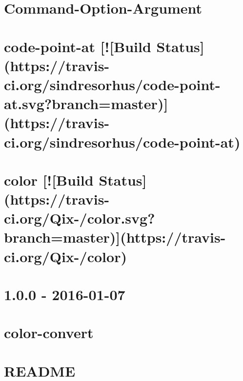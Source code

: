 \documentclass[twoside]{book}
\newcommand{\+}{\discretionary{\mbox{\scriptsize$\hookleftarrow$}}{}{}}
\begin{document}
\chapter{Command-\/\+Option-\/\+Argument}
\label{md__c_1_workspace_demo_src_main_script_node_modules_coa__r_e_a_d_m_e_8ru}

\chapter{code-\/point-\/at \mbox{[}!\mbox{[}Build Status\mbox{]}(https\+://travis-\/ci.org/sindresorhus/code-\/point-\/at.svg?branch=master)\mbox{]}(https\+://travis-\/ci.org/sindresorhus/code-\/point-\/at)}
\label{md__c_1_workspace_demo_src_main_script_node_modules_code-point-at_readme}

\chapter{color \mbox{[}!\mbox{[}Build Status\mbox{]}(https\+://travis-\/ci.org/\+Qix-\//color.svg?branch=master)\mbox{]}(https\+://travis-\/ci.org/\+Qix-\//color)}
\label{md__c_1_workspace_demo_src_main_script_node_modules_color__r_e_a_d_m_e}

\chapter{1.0.0 -\/ 2016-\/01-\/07}
\label{md__c_1_workspace_demo_src_main_script_node_modules_color-convert__c_h_a_n_g_e_l_o_g}

\chapter{color-\/convert}
\label{md__c_1_workspace_demo_src_main_script_node_modules_color-convert__r_e_a_d_m_e}

\chapter{R\+E\+A\+D\+ME}
\label{md__c_1_workspace_demo_src_main_script_node_modules_color-name__r_e_a_d_m_e}

\end{document}
